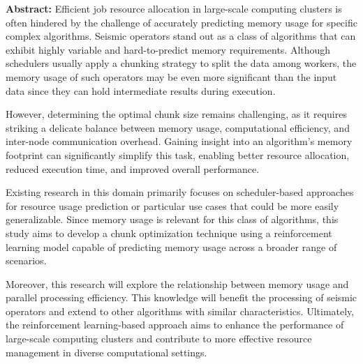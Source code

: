 \textbf{Abstract:} Efficient job resource allocation in large-scale computing clusters is often hindered by the challenge of accurately predicting memory usage for specific complex algorithms.
Seismic operators stand out as a class of algorithms that can exhibit highly variable and hard-to-predict memory requirements.
Although schedulers usually apply a chunking strategy to split the data among workers, the memory usage of such operators may be even more significant than the input data since they can hold intermediate results during execution.

However, determining the optimal chunk size remains challenging, as it requires striking a delicate balance between memory usage, computational efficiency, and inter-node communication overhead.
Gaining insight into an algorithm's memory footprint can significantly simplify this task, enabling better resource allocation, reduced execution time, and improved overall performance.

Existing research in this domain primarily focuses on scheduler-based approaches for resource usage prediction or particular use cases that could be more easily generalizable.
Since memory usage is relevant for this class of algorithms, this study aims to develop a chunk optimization technique using a reinforcement learning model capable of predicting memory usage across a broader range of scenarios.

Moreover, this research will explore the relationship between memory usage and parallel processing efficiency.
This knowledge will benefit the processing of seismic operators and extend to other algorithms with similar characteristics.
Ultimately, the reinforcement learning-based approach aims to enhance the performance of large-scale computing clusters and contribute to more effective resource management in diverse computational settings.
